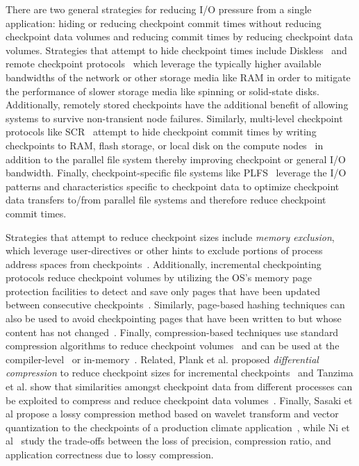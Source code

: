 There are two general strategies for reducing I/O pressure from a single application:
hiding or reducing checkpoint commit times without reducing checkpoint data volumes
and reducing commit times by reducing checkpoint data volumes.  Strategies that
attempt to hide checkpoint times include Diskless~\cite{Plank98Diskless} and remote
checkpoint protocols~\cite{Cornwell11RemoteBLCR} which leverage the typically higher
available bandwidths of the network or other storage media like RAM in order to
mitigate the performance of slower storage media like spinning or solid-state
disks. Additionally, remotely stored checkpoints have the additional benefit of
allowing systems to survive non-transient node failures. Similarly, multi-level
checkpoint protocols like SCR~\cite{Moody10SCR,Vaidya95TwoLevel} attempt to hide
checkpoint commit times by writing checkpoints to RAM, flash storage, or local disk
on the compute nodes~\cite{Kougkas2017} in addition to the parallel file system
thereby improving checkpoint or general I/O bandwidth.  Finally, checkpoint-specific
file systems like PLFS~\cite{Bent09PLFS} leverage the I/O patterns and
characteristics specific to checkpoint data to optimize checkpoint data transfers
to/from parallel file systems and therefore reduce checkpoint commit times.

Strategies that attempt to reduce checkpoint sizes include \emph{memory
exclusion}, which leverage user-directives or other hints to exclude portions of
process address spaces from checkpoints~\cite{Plank99MemoryExclusion}.
Additionally, incremental checkpointing protocols reduce checkpoint volumes by
utilizing the OS's memory page protection facilities to detect and save only
pages that have been updated between consecutive
checkpoints~\cite{Bronevetsky09Compiler,
Chen97CLIP,Elnozahy92ConsistentCheckpointing,Li94ConcurrentCheckpointing,
Plank94Libckpt,Paun10IncrementalWeibull,Kiswany08stdchk}.  Similarly,
page-based hashing techniques can also be used to avoid checkpointing pages
that have been written to but whose content has not
changed~\cite{Ferreira11Libhashckpt}.  Finally, compression-based techniques
use standard compression algorithms to reduce checkpoint
volumes~\cite{Ibtesham12Compression} and can be used at the
compiler-level~\cite{Li90CATCH} or in-memory~\cite{Plank94ICKP}.  Related,
Plank et al. proposed \textit{differential compression} to reduce checkpoint
sizes for incremental checkpoints~\cite{Plank95CompressedDiff} and Tanzima et
al.  show that similarities amongst checkpoint data from different processes
can be exploited to compress and reduce checkpoint data
volumes~\cite{tanzima12mcrengine}.  Finally, Sasaki et al propose a lossy
compression method based on wavelet transform and vector quantization to the
checkpoints of a production climate application~\cite{sasaki2015}, while Ni et
al~\cite{Ni2014} study the trade-offs between the loss of precision, compression
ratio, and application correctness due to lossy compression.

